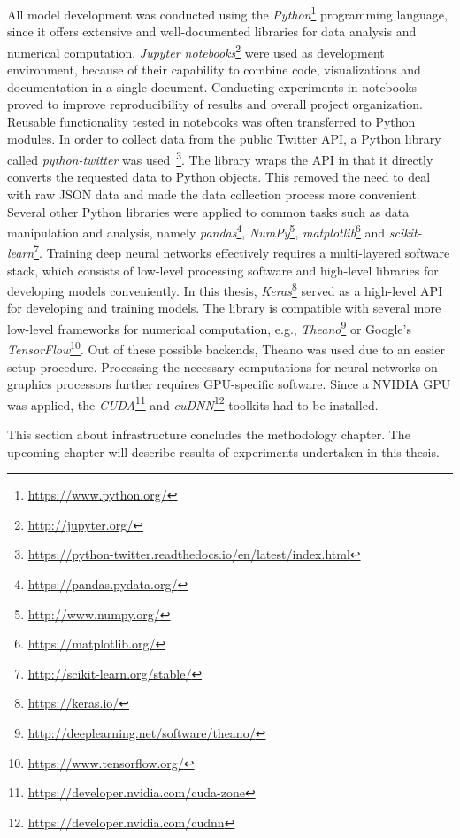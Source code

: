 All model development was conducted using the \textit{Python}\footnote{\url{https://www.python.org/}} programming language,
since it offers extensive and well-documented libraries for data analysis and numerical computation.
\textit{Jupyter notebooks}\footnote{\url{http://jupyter.org/}} were used as development environment, because
of their capability to combine code, visualizations and documentation in a single
document.
Conducting experiments in notebooks proved to improve reproducibility of results
and overall project organization.
Reusable functionality tested in notebooks was often transferred to Python
modules.
In order to collect data from the public Twitter API, a Python library called
\textit{python-twitter} was used~\footnote{\url{https://python-twitter.readthedocs.io/en/latest/index.html}}.
The library wraps the API in that it directly converts the requested
data to Python objects.
This removed the need to deal with raw JSON data and made the data collection
process more convenient.
Several other Python libraries were applied to common tasks such as data
manipulation and analysis, namely \textit{pandas}\footnote{\url{https://pandas.pydata.org/}},
\textit{NumPy}\footnote{\url{http://www.numpy.org/}},
\textit{matplotlib}\footnote{\url{https://matplotlib.org/}} and
\textit{scikit-learn}\footnote{\url{http://scikit-learn.org/stable/}}.
Training deep neural networks effectively requires a multi-layered software
stack, which consists of low-level processing software and high-level libraries
for developing models conveniently.
In this thesis, \textit{Keras}\footnote{\url{https://keras.io/}} served as a
high-level API for developing and training models.
The library is compatible with several more low-level frameworks for numerical
computation, e.g., \textit{Theano}\footnote{\url{http://deeplearning.net/software/theano/}} 
or Google's \textit{TensorFlow}\footnote{\url{https://www.tensorflow.org/}}.
Out of these possible backends, Theano was used due to an easier setup procedure.
Processing the necessary computations for neural networks on graphics processors
further requires GPU-specific software.
Since a NVIDIA GPU was applied, the \textit{CUDA}\footnote{\url{https://developer.nvidia.com/cuda-zone}}
and \textit{cuDNN}\footnote{\url{https://developer.nvidia.com/cudnn}} toolkits
had to be installed.

This section about infrastructure concludes the methodology chapter.
The upcoming chapter will describe results of experiments undertaken in this
thesis.
